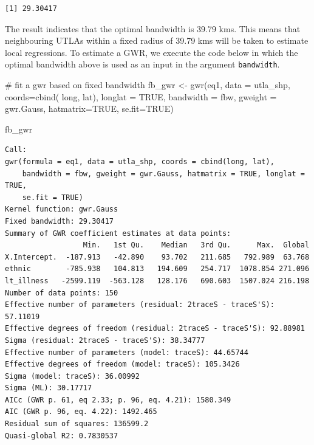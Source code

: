 \documentclass[
  letterpaper,
  DIV=11,
  numbers=noendperiod,
  oneside]{scrreprt}
\newenvironment{Shaded}{\begin{snugshade}}{\end{snugshade}}
\newcommand{\AttributeTok}[1]{\textcolor[rgb]{0.40,0.45,0.13}{#1}}
\newcommand{\CommentTok}[1]{\textcolor[rgb]{0.37,0.37,0.37}{#1}}
\newcommand{\ConstantTok}[1]{\textcolor[rgb]{0.56,0.35,0.01}{#1}}
\newcommand{\FunctionTok}[1]{\textcolor[rgb]{0.28,0.35,0.67}{#1}}
\newcommand{\NormalTok}[1]{\textcolor[rgb]{0.00,0.23,0.31}{#1}}
\newcommand{\OtherTok}[1]{\textcolor[rgb]{0.00,0.23,0.31}{#1}}
\begin{document}
\begin{verbatim}
[1] 29.30417
\end{verbatim}

The result indicates that the optimal bandwidth is 39.79 kms. This means
that neighbouring UTLAs within a fixed radius of 39.79 kms will be taken
to estimate local regressions. To estimate a GWR, we execute the code
below in which the optimal bandwidth above is used as an input in the
argument \texttt{bandwidth}.

\begin{Shaded}
\begin{Highlighting}[]
\CommentTok{\# fit a gwr based on fixed bandwidth}
\NormalTok{fb\_gwr }\OtherTok{\textless{}{-}} \FunctionTok{gwr}\NormalTok{(eq1, }
            \AttributeTok{data =}\NormalTok{ utla\_shp,}
            \AttributeTok{coords=}\FunctionTok{cbind}\NormalTok{( long, lat),}
            \AttributeTok{longlat =} \ConstantTok{TRUE}\NormalTok{,}
            \AttributeTok{bandwidth =}\NormalTok{ fbw, }
            \AttributeTok{gweight =}\NormalTok{ gwr.Gauss,}
            \AttributeTok{hatmatrix=}\ConstantTok{TRUE}\NormalTok{, }
            \AttributeTok{se.fit=}\ConstantTok{TRUE}\NormalTok{)}

\NormalTok{fb\_gwr}
\end{Highlighting}
\end{Shaded}

\begin{verbatim}
Call:
gwr(formula = eq1, data = utla_shp, coords = cbind(long, lat), 
    bandwidth = fbw, gweight = gwr.Gauss, hatmatrix = TRUE, longlat = TRUE, 
    se.fit = TRUE)
Kernel function: gwr.Gauss 
Fixed bandwidth: 29.30417 
Summary of GWR coefficient estimates at data points:
                  Min.   1st Qu.    Median   3rd Qu.      Max.  Global
X.Intercept.  -187.913   -42.890    93.702   211.685   792.989  63.768
ethnic        -785.938   104.813   194.609   254.717  1078.854 271.096
lt_illness   -2599.119  -563.128   128.176   690.603  1507.024 216.198
Number of data points: 150 
Effective number of parameters (residual: 2traceS - traceS'S): 57.11019 
Effective degrees of freedom (residual: 2traceS - traceS'S): 92.88981 
Sigma (residual: 2traceS - traceS'S): 38.34777 
Effective number of parameters (model: traceS): 44.65744 
Effective degrees of freedom (model: traceS): 105.3426 
Sigma (model: traceS): 36.00992 
Sigma (ML): 30.17717 
AICc (GWR p. 61, eq 2.33; p. 96, eq. 4.21): 1580.349 
AIC (GWR p. 96, eq. 4.22): 1492.465 
Residual sum of squares: 136599.2 
Quasi-global R2: 0.7830537 
\end{verbatim}
\end{document}

